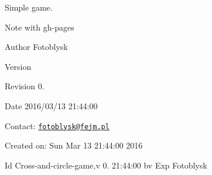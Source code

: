 Simple game.\begin{DoxyNote}{Note}
with gh-\/pages
\end{DoxyNote}
\begin{DoxyAuthor}{Author}
Fotoblysk
\end{DoxyAuthor}
\begin{DoxyVersion}{Version}

\end{DoxyVersion}
\begin{DoxyParagraph}{Revision}
0. 
\end{DoxyParagraph}


\begin{DoxyDate}{Date}
2016/03/13 21\+:44\+:00
\end{DoxyDate}
Contact\+: \href{mailto:fotoblysk@fejm.pl}{\tt fotoblysk@fejm.\+pl}

Created on\+: Sun Mar 13 21\+:44\+:00 2016

\begin{DoxyParagraph}{Id}
Cross-\/and-\/circle-\/game,v 0. 21\+:44\+:00 bv Exp Fotoblysk
\end{DoxyParagraph}

